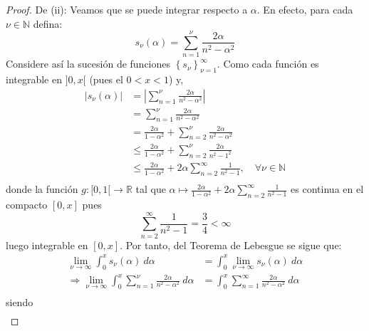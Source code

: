 \documentclass[12pt]{report}
\newcounter{it}
\theoremstyle{largebreak}
\renewcommand{\leq}{\ensuremath{\leqslant}}
\newcommand\abs[1]{\ensuremath{\left|#1\right|}}
\newcommand\cf[3]{\ensuremath{#1:#2\rightarrow#3}}
\begin{document}
\begin{proof}
        De (ii): Veamos que se puede integrar respecto a $\alpha$. En efecto, para cada $\nu\in\mathbb{N}$ defina:
        \begin{equation*}
            s_\nu(\alpha)=\sum_{n=1}^\nu\frac{2\alpha}{n^2-\alpha^2}
        \end{equation*}
        Considere así la sucesión de funciones $\left\{s_\nu\right\}_{\nu=1}^\infty$. Como cada función es integrable en $]0,x[$ (pues el $0<x<1$) y,
        \begin{equation*}
            \begin{split}
                \abs{s_\nu(\alpha)}&=\abs{\sum_{n=1}^\nu\frac{2\alpha}{n^2-\alpha^2}}\\
                &=\sum_{n=1}^\nu\frac{2\alpha}{n^2-\alpha^2}\\
                &=\frac{2\alpha}{1-\alpha^2}+\sum_{n=2}^\nu\frac{2\alpha}{n^2-\alpha^2}\\
                &\leq\frac{2\alpha}{1-\alpha^2}+\sum_{n=2}^\nu\frac{2\alpha}{n^2-1^2}\\
                &\leq\frac{2\alpha}{1-\alpha^2}+2\alpha\sum_{n=2}^\infty\frac{1}{n^2-1},\quad\forall\nu\in\mathbb{N} \\
            \end{split}
        \end{equation*}
        donde la función $\cf{g}{[0,1[}{\mathbb{R}}$ tal que $\alpha\mapsto \frac{2\alpha}{1-\alpha^2}+2\alpha\sum_{n=2}^\infty\frac{1}{n^2-1}$ es continua en el compacto $[0,x]$ pues
        \begin{equation*}
            \sum_{n=2}^\infty\frac{1}{n^2-1}=\frac{3}{4}<\infty
        \end{equation*}
        luego integrable en $[0,x]$. Por tanto, del Teorema de Lebesgue se sigue que:
        \begin{equation*}
            \begin{split}
                \lim_{\nu\rightarrow\infty}\int_{0}^x s_\nu(\alpha)\:d\alpha&=\int_0^x\lim_{\nu\rightarrow\infty}s_\nu(\alpha)\:d\alpha\\
                \Rightarrow \lim_{\nu\rightarrow\infty}\int_{0}^x \sum_{n=1}^\nu\frac{2\alpha}{n^2-\alpha^2}\:d\alpha&=\int_0^x\sum_{ n=1}^\infty\frac{2\alpha}{n^2-\alpha^2}\:d\alpha\\
            \end{split}
        \end{equation*}
        siendo
        \begin{equation*}
            \begin{split}

\end{split}
\end{equation*}
\end{proof}
\end{document}
